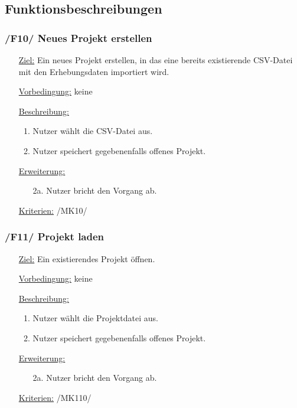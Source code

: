 \documentclass{article}
\begin{document}
\subsection{Funktionsbeschreibungen}
\subsubsection*{/F10/ Neues Projekt erstellen}
\begin{itemize}
    \item[\underline{Ziel:}] Ein neues Projekt erstellen, in das eine bereits existierende CSV-Datei mit den Erhebungsdaten importiert wird.
    \item[\underline{Vorbedingung:}] keine
    \item[\underline{Beschreibung:}]
    \begin{enumerate}
        \item Nutzer wählt die CSV-Datei aus.
        \item Nutzer speichert gegebenenfalls offenes Projekt.
    \end{enumerate}
    \item[\underline{Erweiterung:}]
    \begin{itemize}
        \item[2a.] Nutzer bricht den Vorgang ab.
    \end{itemize}
    \item[\underline{Kriterien:}] /MK10/
\end{itemize}

\subsubsection*{/F11/ Projekt laden}
\begin{itemize}
    \item[\underline{Ziel:}] Ein existierendes Projekt öffnen.
    \item[\underline{Vorbedingung:}] keine
    \item[\underline{Beschreibung:}]
    \begin{enumerate}
        \item Nutzer wählt die Projektdatei aus.
        \item Nutzer speichert gegebenenfalls offenes Projekt.
    \end{enumerate}
    \item[\underline{Erweiterung:}]
    \begin{itemize}
        \item[2a.] Nutzer bricht den Vorgang ab.
    \end{itemize}
    \item[\underline{Kriterien:}] /MK110/
\end{itemize}
\end{document}
